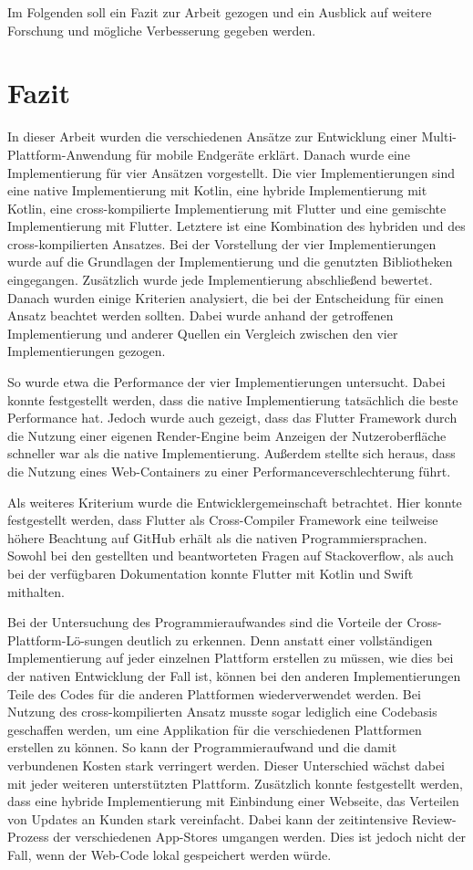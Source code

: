 Im Folgenden soll ein Fazit zur Arbeit gezogen und ein Ausblick auf weitere Forschung und mögliche Verbesserung gegeben werden.

\section{Fazit}
In dieser Arbeit wurden die verschiedenen Ansätze zur Entwicklung einer Multi-Plattform-Anwendung für mobile Endgeräte erklärt. Danach wurde eine Implementierung für vier Ansätzen vorgestellt. Die vier Implementierungen sind eine native Implementierung mit Kotlin, eine hybride Implementierung mit Kotlin, eine cross-kompilierte Implementierung mit Flutter und eine gemischte Implementierung mit Flutter. Letztere ist eine Kombination des hybriden und des cross-kompilierten Ansatzes. Bei der Vorstellung der vier Implementierungen wurde auf die Grundlagen der Implementierung und die genutzten Bibliotheken eingegangen. Zusätzlich wurde jede Implementierung abschließend bewertet. Danach wurden einige Kriterien analysiert, die bei der Entscheidung für einen Ansatz beachtet werden sollten. Dabei wurde anhand der getroffenen Implementierung und anderer Quellen ein Vergleich zwischen den vier Implementierungen gezogen.

So wurde etwa die Performance der vier Implementierungen untersucht. Dabei konnte festgestellt werden, dass die native Implementierung tatsächlich die beste Performance hat. Jedoch wurde auch gezeigt, dass das Flutter Framework durch die Nutzung einer eigenen Render-Engine beim Anzeigen der Nutzeroberfläche schneller war als die native Implementierung. Außerdem stellte sich heraus, dass die Nutzung eines Web-Containers zu einer Performanceverschlechterung führt. 

Als weiteres Kriterium wurde die Entwicklergemeinschaft betrachtet.
Hier konnte festgestellt werden, dass Flutter als Cross-Compiler Framework eine teilweise höhere Beachtung auf GitHub erhält als die nativen Programmiersprachen. 
Sowohl bei den gestellten und beantworteten Fragen auf Stackoverflow, als auch bei der verfügbaren Dokumentation konnte Flutter mit Kotlin und Swift mithalten.

Bei der Untersuchung des Programmieraufwandes sind die Vorteile der Cross-Plattform-Lö-sungen deutlich zu erkennen. Denn anstatt einer vollständigen Implementierung auf jeder einzelnen Plattform erstellen zu müssen, wie dies bei der nativen Entwicklung der Fall ist, können bei den anderen Implementierungen Teile des Codes für die anderen Plattformen wiederverwendet werden. Bei Nutzung des cross-kompilierten Ansatz musste sogar lediglich eine Codebasis geschaffen werden, um eine Applikation für die verschiedenen Plattformen erstellen zu können. So kann der Programmieraufwand und die damit verbundenen Kosten stark verringert werden. Dieser Unterschied wächst dabei mit jeder weiteren unterstützten Plattform.
Zusätzlich konnte festgestellt werden, dass eine hybride Implementierung mit Einbindung einer Webseite, das Verteilen von Updates an Kunden stark vereinfacht. Dabei kann der zeitintensive Review-Prozess der verschiedenen App-Stores umgangen werden. Dies ist jedoch nicht der Fall, wenn der Web-Code lokal gespeichert werden würde.

